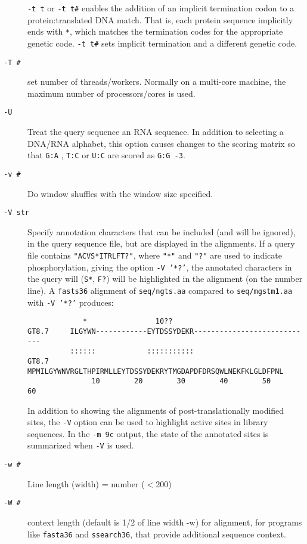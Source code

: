 \documentclass[11pt]{article}
\begin{document}
\begin{description}
\texttt{-t t} or \texttt{-t t\#} enables the addition of
an implicit termination codon to a protein:translated DNA match.  That
is, each protein sequence implicitly ends with \texttt{*}, which
matches the termination codes for the appropriate genetic code.
\texttt{-t t\#} sets implicit termination and a different genetic
code.
\item[\texttt{-T \#}]
set number of threads/workers.  Normally on a multi-core machine, the maximum
number of processors/cores is used.
\item[\texttt{-U}]
Treat the query sequence an RNA sequence.  In addition to selecting a
DNA/RNA alphabet, this option causes changes to the scoring matrix so
that \texttt{G:A} , \texttt{T:C} or \texttt{U:C} are scored as \mbox{\texttt{G:G -3}}.
\item[\texttt{-v \#}]
Do window shuffles with the window size specified.
\item[\texttt{-V str}] Specify annotation characters that can be
  included (and will be ignored), in the query sequence file, but are
  displayed in the alignments.  If a query file contains
  \texttt{"ACVS*ITRLFT?"}, where \texttt{"*"} and \texttt{"?"}  are
  used to indicate phosphorylation, giving the option \mbox{\texttt{-V '*?'}}, the annotated characters in the query will (\texttt{S*}, \texttt{F?}) will be highlighted in the alignment (on the number line). A \texttt{fasts36} alignment of \texttt{seq/ngts.aa} compared to \texttt{seq/mgstm1.aa} with \texttt{-V '*?'} produces:
\begin{footnotesize}
\begin{verbatim}
             *                10??                                 
GT8.7     ILGYWN------------EYTDSSYDEKR----------------------------
          ::::::            :::::::::::                            
GT8.7  MPMILGYWNVRGLTHPIRMLLEYTDSSYDEKRYTMGDAPDFDRSQWLNEKFKLGLDFPNL
               10        20        30        40        50        60
\end{verbatim}
\end{footnotesize}
In addition to showing the alignments of post-translationally modified
sites, the \texttt{-V} option can be used to highlight active sites in
library sequences. In the \texttt{-m 9c} output, the state of the
annotated sites is summarized when \texttt{-V} is used.

\item[\texttt{-w \#}]
Line length (width) = number ($<$200)
\item[\texttt{-W \#}] context length (default is 1/2 of line width -w)
  for alignment, for programs like \texttt{fasta36} and
  \texttt{ssearch36}, that provide additional sequence context.


\end{description}
\end{document}

